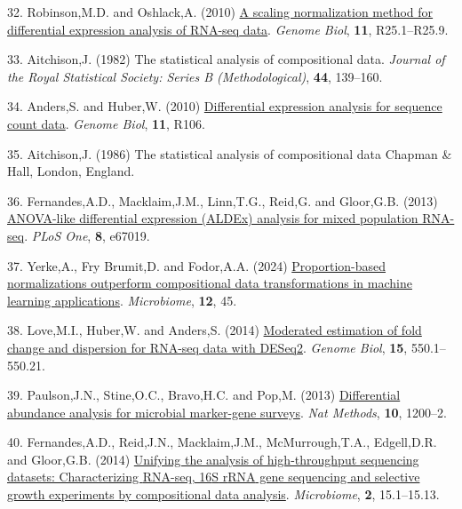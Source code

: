 \documentclass[
]{article}
\newlength{\cslhangindent}
\newenvironment{CSLReferences}[2] %
 {\begin{list}{}{%
  \setlength{\itemindent}{0pt}
  \setlength{\leftmargin}{0pt}
  \setlength{\parsep}{0pt}
  \ifodd #1
   \setlength{\leftmargin}{\cslhangindent}
   \setlength{\itemindent}{-1\cslhangindent}
  \fi
  \setlength{\itemsep}{#2\baselineskip}}}
 {\end{list}}
\begin{document}
\begin{CSLReferences}{1}{1}
32. Robinson,M.D. and Oshlack,A. (2010)
\href{https://doi.org/10.1186/gb-2010-11-3-r25}{A scaling normalization
method for differential expression analysis of {RNA-seq} data}.
\emph{Genome Biol}, \textbf{11}, R25.1--R25.9.

33. Aitchison,J. (1982) The statistical analysis of compositional data.
\emph{Journal of the Royal Statistical Society: Series B
(Methodological)}, \textbf{44}, 139--160.

34. Anders,S. and Huber,W. (2010)
\href{https://doi.org/10.1186/gb-2010-11-10-r106}{Differential
expression analysis for sequence count data}. \emph{Genome Biol},
\textbf{11}, R106.

35. Aitchison,J. (1986) The statistical analysis of compositional data
Chapman \& Hall, London, England.

36. Fernandes,A.D., Macklaim,J.M., Linn,T.G., Reid,G. and Gloor,G.B.
(2013) \href{https://doi.org/10.1371/journal.pone.0067019}{ANOVA-like
differential expression (ALDEx) analysis for mixed population RNA-seq}.
\emph{PLoS One}, \textbf{8}, e67019.

37. Yerke,A., Fry Brumit,D. and Fodor,A.A. (2024)
\href{https://doi.org/10.1186/s40168-023-01747-z}{Proportion-based
normalizations outperform compositional data transformations in machine
learning applications}. \emph{Microbiome}, \textbf{12}, 45.

38. Love,M.I., Huber,W. and Anders,S. (2014)
\href{https://doi.org/10.1186/s13059-014-0550-8}{Moderated estimation of
fold change and dispersion for RNA-seq data with DESeq2}. \emph{Genome
Biol}, \textbf{15}, 550.1--550.21.

39. Paulson,J.N., Stine,O.C., Bravo,H.C. and Pop,M. (2013)
\href{https://doi.org/10.1038/nmeth.2658}{Differential abundance
analysis for microbial marker-gene surveys}. \emph{Nat Methods},
\textbf{10}, 1200--2.

40. Fernandes,A.D., Reid,J.N., Macklaim,J.M., McMurrough,T.A.,
Edgell,D.R. and Gloor,G.B. (2014)
\href{https://doi.org/10.1186/2049-2618-2-15}{Unifying the analysis of
high-throughput sequencing datasets: Characterizing {RNA}-seq, 16{S}
r{RNA} gene sequencing and selective growth experiments by compositional
data analysis}. \emph{Microbiome}, \textbf{2}, 15.1--15.13.


\end{CSLReferences}
\end{document}
